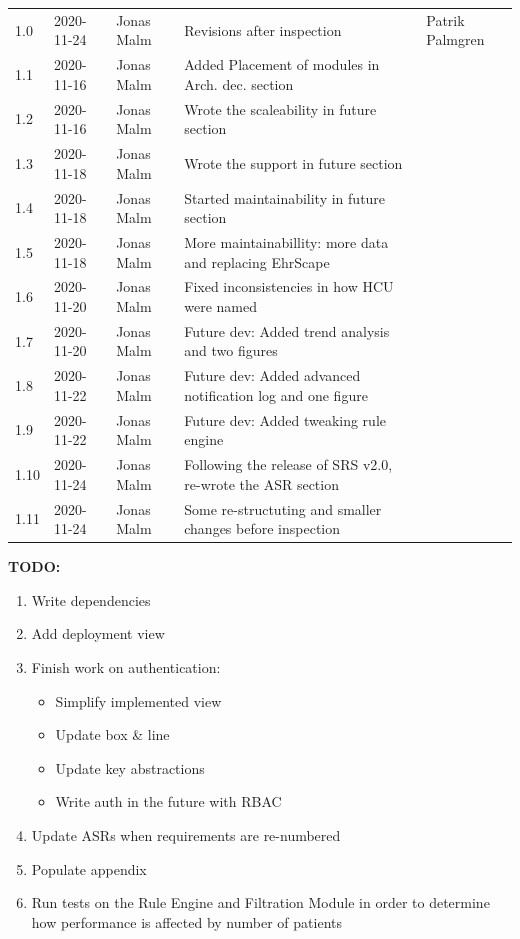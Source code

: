 \documentclass{article}
\begin{document}
\begin{table}
\begin{tabular}{|l|l|l|p{7cm}|p{3cm}|}
1.0 & 2020-11-24 & Jonas Malm & Revisions after inspection & Patrik Palmgren\\
1.1 & 2020-11-16 & Jonas Malm & Added Placement of modules in Arch. dec. section & \\
1.2 & 2020-11-16 & Jonas Malm & Wrote the scaleability in future section & \\
1.3 & 2020-11-18 & Jonas Malm & Wrote the support in future section & \\
1.4 & 2020-11-18 & Jonas Malm & Started maintainability in future section & \\
1.5 & 2020-11-18 & Jonas Malm & More maintainabillity: more data and replacing EhrScape & \\
1.6 & 2020-11-20 & Jonas Malm & Fixed inconsistencies in how HCU were named & \\
1.7 & 2020-11-20 & Jonas Malm & Future dev: Added trend analysis and two figures & \\
1.8 & 2020-11-22 & Jonas Malm & Future dev: Added advanced notification log and one figure & \\
1.9 & 2020-11-22 & Jonas Malm & Future dev: Added tweaking rule engine & \\
1.10 & 2020-11-24 & Jonas Malm & Following the release of SRS v2.0, re-wrote the ASR section & \\
1.11 & 2020-11-24 & Jonas Malm & Some re-structuting and smaller changes before inspection & \\


\hline
\end{tabular}
\end{table}
\restoregeometry

\textbf{TODO:}
\begin{enumerate}[label=(\roman*)]
\item Write dependencies
\item Add deployment view
\item Finish work on authentication:
\begin{itemize}
    \item Simplify implemented view
    \item Update box & line
    \item Update key abstractions
    \item Write auth in the future with RBAC
\end{itemize}
\item Update ASRs when requirements are re-numbered
\item Populate appendix
\item Run tests on the Rule Engine and Filtration Module in order to determine how performance is affected by number of patients
\end{enumerate}
\end{document}

